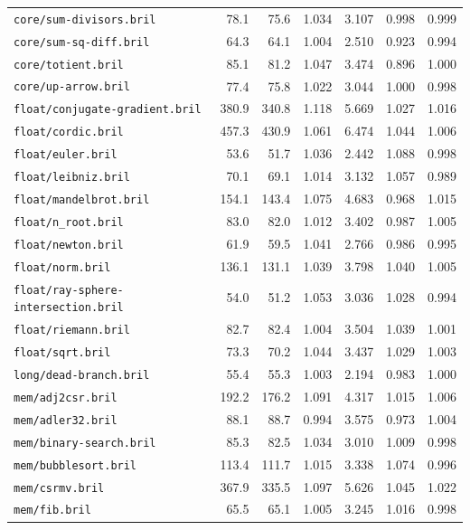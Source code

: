\begin{longtable}{p{52mm}rrrrrr}
\nolinkurl{core/sum-divisors.bril} & 78.1 & 75.6 & 1.034 & 3.107 & 0.998 & 0.999 \\
\nolinkurl{core/sum-sq-diff.bril} & 64.3 & 64.1 & 1.004 & 2.510 & 0.923 & 0.994 \\
\nolinkurl{core/totient.bril} & 85.1 & 81.2 & 1.047 & 3.474 & 0.896 & 1.000 \\
\nolinkurl{core/up-arrow.bril} & 77.4 & 75.8 & 1.022 & 3.044 & 1.000 & 0.998 \\
\nolinkurl{float/conjugate-gradient.bril} & 380.9 & 340.8 & 1.118 & 5.669 & 1.027 & 1.016 \\
\nolinkurl{float/cordic.bril} & 457.3 & 430.9 & 1.061 & 6.474 & 1.044 & 1.006 \\
\nolinkurl{float/euler.bril} & 53.6 & 51.7 & 1.036 & 2.442 & 1.088 & 0.998 \\
\nolinkurl{float/leibniz.bril} & 70.1 & 69.1 & 1.014 & 3.132 & 1.057 & 0.989 \\
\nolinkurl{float/mandelbrot.bril} & 154.1 & 143.4 & 1.075 & 4.683 & 0.968 & 1.015 \\
\nolinkurl{float/n_root.bril} & 83.0 & 82.0 & 1.012 & 3.402 & 0.987 & 1.005 \\
\nolinkurl{float/newton.bril} & 61.9 & 59.5 & 1.041 & 2.766 & 0.986 & 0.995 \\
\nolinkurl{float/norm.bril} & 136.1 & 131.1 & 1.039 & 3.798 & 1.040 & 1.005 \\
\nolinkurl{float/ray-sphere-intersection.bril} & 54.0 & 51.2 & 1.053 & 3.036 & 1.028 & 0.994 \\
\nolinkurl{float/riemann.bril} & 82.7 & 82.4 & 1.004 & 3.504 & 1.039 & 1.001 \\
\nolinkurl{float/sqrt.bril} & 73.3 & 70.2 & 1.044 & 3.437 & 1.029 & 1.003 \\
\nolinkurl{long/dead-branch.bril} & 55.4 & 55.3 & 1.003 & 2.194 & 0.983 & 1.000 \\
\nolinkurl{mem/adj2csr.bril} & 192.2 & 176.2 & 1.091 & 4.317 & 1.015 & 1.006 \\
\nolinkurl{mem/adler32.bril} & 88.1 & 88.7 & 0.994 & 3.575 & 0.973 & 1.004 \\
\nolinkurl{mem/binary-search.bril} & 85.3 & 82.5 & 1.034 & 3.010 & 1.009 & 0.998 \\
\nolinkurl{mem/bubblesort.bril} & 113.4 & 111.7 & 1.015 & 3.338 & 1.074 & 0.996 \\
\nolinkurl{mem/csrmv.bril} & 367.9 & 335.5 & 1.097 & 5.626 & 1.045 & 1.022 \\
\nolinkurl{mem/fib.bril} & 65.5 & 65.1 & 1.005 & 3.245 & 1.016 & 0.998 \\

\end{longtable}
